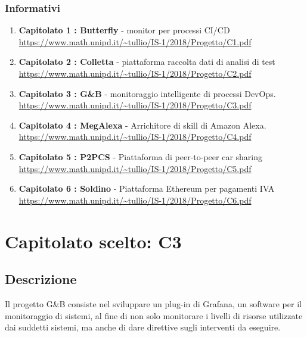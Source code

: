 \documentclass{article}
\begin{document}
         \subsubsection{Informativi}
            \begin{enumerate}
                \item \textbf{Capitolato 1 : Butterfly} - monitor per processi CI/CD \newline 	\url{ https://www.math.unipd.it/~tullio/IS-1/2018/Progetto/C1.pdf}
			    \item \textbf{Capitolato 2 : Colletta} - piattaforma raccolta dati di analisi di test \newline   \url{https://www.math.unipd.it/~tullio/IS-1/2018/Progetto/C2.pdf}
                \item \textbf{Capitolato 3 : G\&B} - monitoraggio intelligente di processi DevOps. \newline \url{https://www.math.unipd.it/~tullio/IS-1/2018/Progetto/C3.pdf}
                \item \textbf{Capitolato 4 : MegAlexa} - Arrichitore di skill di Amazon Alexa. \newline \url{https://www.math.unipd.it/~tullio/IS-1/2018/Progetto/C4.pdf}
                \item \textbf{Capitolato 5 : P2PCS} - Piattaforma di peer-to-peer car sharing \newline  \url{https://www.math.unipd.it/~tullio/IS-1/2018/Progetto/C5.pdf}
                \item \textbf{Capitolato 6 : Soldino} - Piattaforma Ethereum per pagamenti IVA \newline \url{https://www.math.unipd.it/~tullio/IS-1/2018/Progetto/C6.pdf}
            \end{enumerate}




			
\newpage
    \section{Capitolato scelto: C3}
        \subsection{Descrizione}
            Il progetto G\&B consiste nel sviluppare un plug-in di Grafana, un software per il monitoraggio di sistemi, al fine di non solo monitorare i livelli di risorse utilizzate dai suddetti sistemi, ma anche di dare direttive sugli interventi da eseguire.
\end{document}
